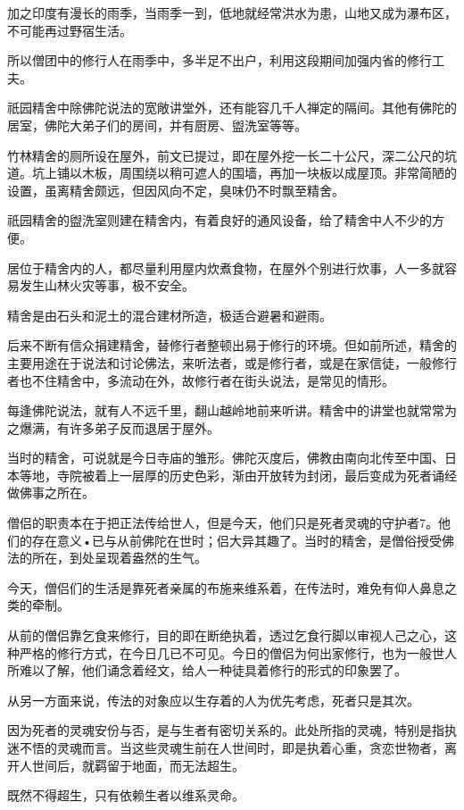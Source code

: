 \documentclass[twoside,openany]{book}
\begin{document}
加之印度有漫长的雨季，当雨季一到，低地就经常洪水为患，山地又成为瀑布区，不可能再过野宿生活。

所以僧团中的修行人在雨季中，多半足不出户，利用这段期间加强内省的修行工夫。

祇园精舍中除佛陀说法的宽敞讲堂外，还有能容几千人禅定的隔间。其他有佛陀的居室，佛陀大弟子们的房间，并有厨房、盥洗室等等。

竹林精舍的厕所设在屋外，前文已提过，即在屋外挖一长二十公尺，深二公尺的坑道。坑上铺以木板，周围绕以稍可遮人的围墙，再加一块板以成屋顶。非常简陋的设置，虽离精舍颇远，但因风向不定，臭味仍不时飘至精舍。

祇园精舍的盥洗室则建在精舍内，有着良好的通风设备，给了精舍中人不少的方便。

居位于精舍内的人，都尽量利用屋内炊煮食物，在屋外个别进行炊事，人一多就容易发生山林火灾等事，极不安全。

精舍是由石头和泥土的混合建材所造，极适合避暑和避雨。

后来不断有信众捐建精舍，替修行者整顿出易于修行的环境。但如前所述，精舍的主要用途在于说法和讨论佛法，来听法者，或是修行者，或是在家信徒，一般修行者也不住精舍中，多流动在外，故修行者在街头说法，是常见的情形。

每逢佛陀说法，就有人不远千里，翻山越岭地前来听讲。精舍中的讲堂也就常常为之爆满，有许多弟子反而退居于屋外。

当时的精舍，可说就是今日寺庙的雏形。佛陀灭度后，佛教由南向北传至中国、日本等地，寺院被着上一层厚的历史色彩，渐由开放转为封闭，最后变成为死者诵经做佛事之所在。

僧侣的职责本在于把正法传给世人，但是今天，他们只是死者灵魂的守护者7。他们的存在意义•已与从前佛陀在世时；侣大异其趣了。当时的精舍，是僧俗授受佛法的所在，到处呈现着盎然的生气。

今天，僧侣们的生活是靠死者亲属的布施来维系着，在传法时，难免有仰人鼻息之类的牵制。

从前的僧侣靠乞食来修行，目的即在断绝执着，透过乞食行脚以审视人己之心，这种严格的修行方式，在今日几已不可见。今日的僧侣为何出家修行，也为一般世人所难以了解，他们诵念着经文，给人一种徒具着修行的形式的印象罢了。

从另一方面来说，传法的对象应以生存着的人为优先考虑，死者只是其次。

因为死者的灵魂安份与否，是与生者有密切关系的。此处所指的灵魂，特别是指执迷不悟的灵魂而言。当这些灵魂生前在人世间时，即是执着心重，贪恋世物者，离开人世间后，就羁留于地面，而无法超生。

既然不得超生，只有依赖生者以维系灵命。
\end{document}
